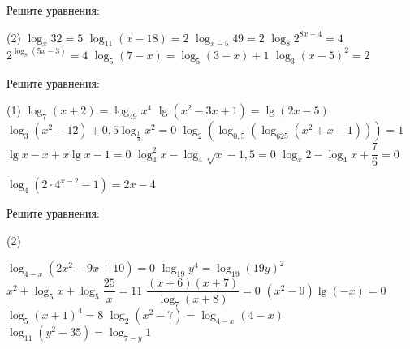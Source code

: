 \begin{class}[number=3]
	\begin{listofex}
		\item Решите уравнения:
		\begin{tasks}(2)
			\task \( \log_x 32 =5 \)
			\task \( \log_{11} (x-18) = 2 \)
			\task \( \log_{x-5}49=2 \)
			\task \( \log_8 2^{8x-4}=4 \)
			\task \( 2^{\log_8 (5x-3)}=4 \)
			\task \( \log_5(7-x)=\log_5(3-x)+1 \)
			\task \( \log_3 (x-5)^2 = 2 \)
		\end{tasks}
		
		\item Решите уравнения: %
		\begin{tasks}(1)
			\task \( \log_7(x+2)=\log_{49}x^4 \)
			\task \( \lg (x^2-3x+1)= \lg (2x-5) \)
			\task \( \log_3 (x^2-12)+ 0,5 \log_{\tfrac{1}{3}} x^2 = 0 \)
			\task \( \log_2 (\log_{0,5} (\log_{625} (x^2+x-1) ) )=1 \)
			\task \( \lg x - x + x \lg x -1 =0 \)
			\task \( \log_4^2x - \log_4 \sqrt{x} - 1,5 = 0 \)
			\task \( \log_x 2 - \log_4 x + \dfrac{7}{6} = 0 \)
			
			\task \( \log_4 (2 \cdot 4^{x-2}-1)=2x-4 \)
		\end{tasks}
		
		
		
		
		
	\end{listofex}
\end{class}

\begin{class}[number=4]
	\begin{listofex}
		\item Решите уравнения: %
		\begin{tasks}(2)
			
			\task \( \log_{4-x} (2x^2-9x+10)=0 \)
			\task \( \log_{19} y^4 = \log_{19}(19y)^2 \)
			\task \( x^2+\log_5 x + \log_5 \dfrac{25}{x}=11 \)
			\task \( \dfrac{(x+6)(x+7)}{\log_7 (x+8)} = 0 \)
			\task \( (x^2-9)\lg(-x)=0 \)
			\task \( \log_5 (x+1)^4=8 \)
			\task \( \log_2 (x^2-7) = \log_{4-x}(4-x) \)
			\task \( \log_{11} (y^2-35)=\log_{7-y} 1 \)
		\end{tasks}
		
		
	\end{listofex}
\end{class}

